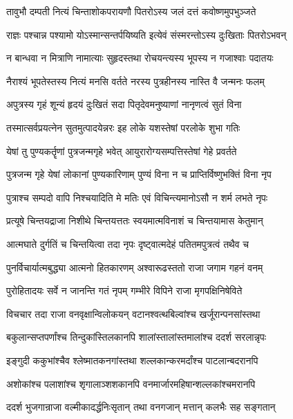 \twolineshloka
{तावुभौ दम्पती नित्यं चिन्ताशोकपरायणौ}
{पितरोऽस्य जलं दत्तं कवोष्णमुपभुञ्जते}%

\twolineshloka
{राज्ञः पश्चान्न पश्यामो योऽस्मान्सन्तर्पयिष्यति}
{इत्येवं संस्मरन्तोऽस्य दुःखिताः पितरोऽभवन्}%

\twolineshloka
{न बान्धवा न मित्राणि नामात्याः सुहृदस्तथा}
{रोचयन्त्यस्य भूपस्य न गजाश्वाः पदातयः}%

\twolineshloka
{नैराश्यं भूपतेस्तस्य नित्यं मनसि वर्तते}
{नरस्य पुत्रहीनस्य नास्ति वै जन्मनः फलम्}%

\twolineshloka
{अपुत्रस्य गृहं शून्यं हृदयं दुःखितं सदा}
{पितृदेवमनुष्याणां नानृणत्वं सुतं विना}%

\twolineshloka
{तस्मात्सर्वप्रयत्नेन सुतमुत्पादयेन्नरः}
{इह लोके यशस्तेषां परलोके शुभा गतिः}%

\twolineshloka
{येषां तु पुण्यकर्तॄणां पुत्रजन्मगृहे भवेत्}
{आयुरारोग्यसम्पत्तिस्तेषां गेहे प्रवर्तते}%

\twolineshloka
{पुत्रजन्म गृहे येषां लोकानां पुण्यकारिणाम्}
{पुण्यं विना न च प्राप्तिर्विष्णुभक्तिं विना नृप}%

\twolineshloka
{पुत्राश्च सम्पदो वापि निश्चयादिति मे मतिः}
{एवं विचिन्त्यमानोऽसौ न शर्म लभते नृपः}%

\twolineshloka
{प्रत्यूषे चिन्तयद्राजा निशीथे चिन्तयत्ततः}
{स्वयमात्मविनाशं च चिन्तयामास केतुमान्}%

\twolineshloka
{आत्मघाते दुर्गतिं च चिन्तयित्वा तदा नृपः}
{दृष्ट्वात्मदेहं पतितमपुत्रत्वं तथैव च}%

\twolineshloka
{पुनर्विचार्यात्मबुद्ध्या आत्मनो हितकारणम्}
{अश्वारूढस्ततो राजा जगाम गहनं वनम्}%

\twolineshloka
{पुरोहितादयः सर्वे न जानन्ति गतं नृपम्}
{गम्भीरे विपिने राजा मृगपक्षिनिषेविते}%

\twolineshloka
{विचचार तदा राजा वनवृक्षान्विलोकयन्}
{वटानश्वत्थबिल्वांश्च खर्जूरान्पनसांस्तथा}%

\twolineshloka
{बकुलान्सप्तपर्णांश्च तिन्दुकांस्तिलकानपि}
{शालांस्तालांस्तमालांश्च ददर्श सरलान्नृपः}%

\twolineshloka
{इङ्गुदी ककुभांश्चैव श्लेष्मातकनगांस्तथा}
{शल्लकान्करमर्दांश्च पाटलान्बदरानपि}%

\twolineshloka
{अशोकांश्च पलाशांश्च शृगालाञ्शशकानपि}
{वनमार्जारमहिषान्शल्लकांश्चमरानपि}%

\twolineshloka
{ददर्श भुजगान्राजा वल्मीकादर्द्धनिःसृतान्}
{तथा वनगजान् मत्तान् कलभैः सह सङ्गतान्}%

